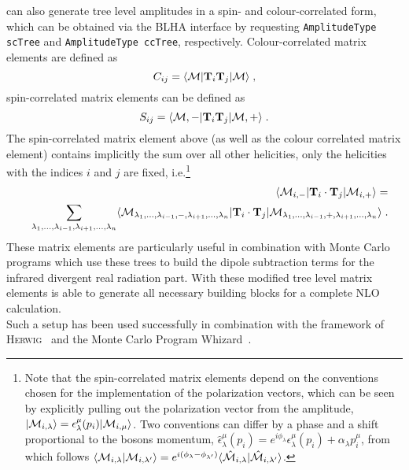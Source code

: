 \gosam{} can also generate  tree level amplitudes in a spin- and colour-correlated form, which can be obtained via the BLHA interface by requesting \texttt{AmplitudeType scTree} and \texttt{AmplitudeType ccTree}, respectively. Colour-correlated matrix elements are defined as
\begin{equation}
 C_{ij}=\langle{{\cal M}}|\textbf{T}_{i}\textbf{T}_j |{{\cal M}}\rangle\;,
\end{equation}
spin-correlated matrix elements can be defined as
\begin{equation}
 S_{ij}=\langle{{\cal M},-}|\textbf{T}_{i}\textbf{T}_j |{{\cal M},+}\rangle\;.
\end{equation}
The spin-correlated matrix element above (as well as the colour correlated matrix element) contains implicitly
the sum over all other helicities, only the helicities with the indices $i$ and $j$ are fixed, i.e.\footnote{Note that the spin-correlated matrix elements depend on the conventions chosen for the implementation of the polarization vectors, which can be seen by explicitly pulling out the polarization vector from the amplitude, $|{\cal M}_{i,\lambda}\rangle=\epsilon_\lambda^\mu(p_i)|{\cal M}_{i,\mu}\rangle$. Two conventions can differ by a phase and a shift proportional to the bosons momentum, $\hat{\epsilon}_\lambda^{\mu}(p_i)=e^{i\phi_\lambda}\epsilon_\lambda^\mu(p_i)+\alpha_\lambda p_i^\mu$, from which follows $\langle{\cal M}_{i,\lambda}|{\cal M}_{i,\lambda'}\rangle=e^{i(\phi_{\lambda}-\phi_{\lambda'})}\langle\hat{{\cal M}}_{i,\lambda}|\hat{{\cal M}}_{i,\lambda'}\rangle$.}
 \begin{eqnarray}
&&\langle {\cal M}_{i,-} |{\mathbf T}_i\cdot {\mathbf T}_j |{\cal M}_{i,+}\rangle =\\
&&\sum_{\lambda_1,...,\lambda_{i-1},\lambda_{i+1},...,\lambda_n}
\langle {\cal M}_{\lambda_1,...,\lambda_{i-1},-,\lambda_{i+1},...,\lambda_n} |
{\mathbf T}_i\cdot {\mathbf T}_j | 
{\cal M}_{\lambda_1,...,\lambda_{i-1},+,\lambda_{i+1},...,\lambda_n}\rangle \;. \nonumber
\end{eqnarray}
These matrix elements are particularly useful in combination with Monte Carlo programs 
which use these trees to build the dipole subtraction terms for the infrared divergent 
real radiation part. With these modified tree level matrix elements \gosam{} is able to generate
all necessary building blocks for a complete NLO calculation.\\
Such a setup has been used successfully in combination with the framework of 
\textsc{Herwig}~\cite{LesHouches2013,Bellm:2013lba,Platzer:2011bc} and the Monte Carlo Program Whizard~\cite{Kilian:2007gr,Moretti:2001zz,Stienemeier:2021cse,Braun:2025hvr}.

